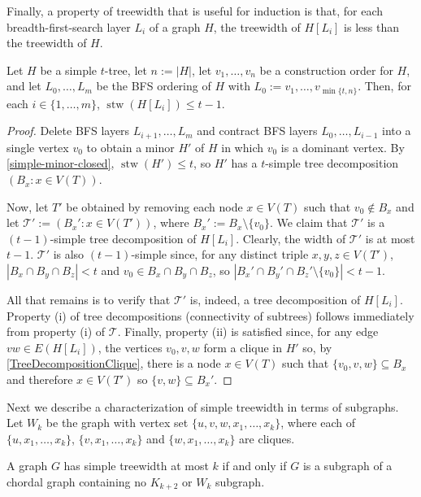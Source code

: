\documentclass[kpfonts]{patmorin}
\DeclareMathOperator{\stw}{stw}
\theoremstyle{named}
\begin{document}
Finally, a property of treewidth that is useful for induction \cite{kundgen.pelsmajer:nonrepetitive,bose.dujmovic.ea:asymptotically} is that, for each breadth-first-search layer $L_i$ of a graph $H$, the treewidth of $H[L_i]$ is less than the treewidth of $H$.

\begin{lem}\label{simple-bfs-layers}
    Let $H$ be a simple $t$-tree, let $n:=|H|$, let $v_1,\ldots,v_n$ be a construction order for $H$, and let $L_0,\ldots,L_m$ be the BFS ordering of $H$ with $L_0:=v_1,\ldots,v_{\min\{t,n\}}$.   Then, for each $i\in\{1,\ldots,m\}$, $\stw(H[L_i])\le t-1$.
\end{lem}

\begin{proof}
    Delete BFS layers $L_{i+1},\ldots,L_m$ and contract BFS layers $L_0,\ldots,L_{i-1}$ into a single vertex $v_0$ to obtain a minor $H'$ of $H$ in which $v_0$ is a dominant vertex.  By \cref{simple-minor-closed}, $\stw(H')\le t$, so $H'$ has a $t$-simple tree decomposition $(B_x:x\in V(T))$.

    Now, let $T'$ be obtained by removing each node $x\in V(T)$ such that $v_0\not\in B_x$ and let $\mathcal{T}':=(B_x':x\in V(T'))$, where $B_x':=B_x\setminus\{v_0\}$.  We claim that $\mathcal{T}'$ is a $(t-1)$-simple tree decomposition of $H[L_i]$.  Clearly, the width of $\mathcal{T}'$ is at most $t-1$.  $\mathcal{T}'$ is also $(t-1)$-simple since, for any distinct triple $x,y,z\in V(T')$, $|B_x\cap B_y\cap B_z|<t$ and $v_0\in B_x\cap B_y\cap B_z$, so $|B_x'\cap B_y'\cap B_z'\setminus\{v_0\}|<t-1$.

    All that remains is to verify that $\mathcal{T}'$ is, indeed, a  tree decomposition of $H[L_i]$.  Property (i) of tree decompositions (connectivity of subtrees) follows immediately from property (i) of $\mathcal{T}$.  Finally, property (ii) is satisfied since, for any edge $vw\in E(H[L_i])$, the vertices $v_0,v,w$ form a clique in $H'$ so, by \cref{TreeDecompositionClique}, there is a node $x\in V(T)$ such that $\{v_0,v,w\}\subseteq B_x$ and therefore $x\in V(T')$ so $\{v,w\}\subseteq B_x'$.
\end{proof}


Next we describe a characterization of simple treewidth in terms of subgraphs. Let $W_k$ be the graph with vertex set $\{u,v,w,x_1,\dots,x_k\}$, where each of
$\{u,x_1,\dots,x_k\}$, $\{v,x_1,\dots,x_k\}$ and $\{w,x_1,\dots,x_k\}$ are cliques.

\begin{lem}
\label{SimpleTreewidthChordal}
    A graph $G$ has simple treewidth at most $k$ if and only if $G$ is a subgraph of a chordal graph containing no $K_{k+2}$ or $W_k$ subgraph.
\end{lem}
\end{document}
